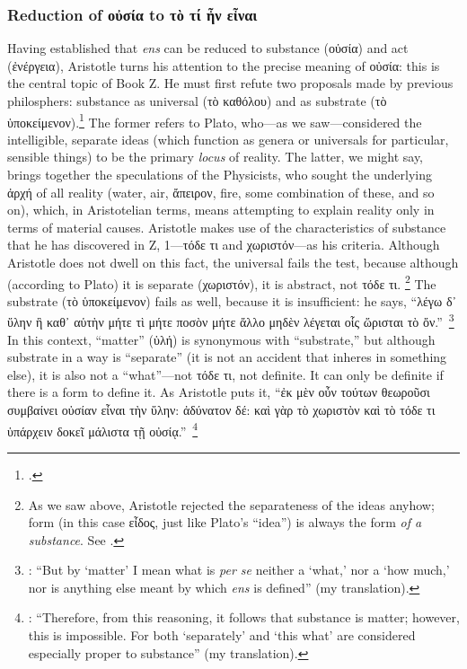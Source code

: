 \subsubsection{Reduction of οὐσία to τὸ τί ἦν εἶναι}
\label{sec:aristotle-reduction}

Having established that \emph{ens} can be reduced to substance (οὐσία) and act (ἐνέργεια), Aristotle turns his attention to the precise meaning of οὐσία: this is the central topic of Book Ζ. He must first refute two proposals made by previous philosphers: substance as universal (τὸ καθόλου) and as substrate (τὸ ὑποκείμενον).\footcite[See][Ζ,~3, 1028b33–35]{aristotle:metaphysics} The former refers to Plato, who—as we saw—considered the intelligible, separate ideas (which function as genera or universals for particular, sensible things) to be the primary \emph{locus} of reality. The latter, we might say, brings together the speculations of the Physicists, who sought the underlying ἀρχή of all reality (water, air, ἄπειρον, fire, some combination of these, and so on), which, in Aristotelian terms, means attempting to explain reality only in terms of material causes. Aristotle makes use of the characteristics of substance that he has discovered in Ζ, 1—τόδε τι and χωριστόν—as his criteria. Although Aristotle does not dwell on this fact, the universal fails the test, because although (according to Plato) it is separate (χωριστόν), it is abstract, not τόδε τι.%
%
\footnote{As we saw above, Aristotle rejected the separateness of the ideas anyhow; form (in this case εἶδος, just like Plato’s “idea”) is always the form \emph{of a substance}. See \cite[Ζ,~3, 1029a30–33]{aristotle:metaphysics}.}
%
The substrate (τὸ ὑποκείμενον) fails as well, because it is insufficient: he says, “λέγω δ᾽ ὕλην ἣ καθ᾽ αὑτὴν μήτε τὶ μήτε ποσὸν μήτε ἄλλο μηδὲν λέγεται οἷς ὥρισται τὸ ὄν.”\,%
%
\footnote{\Cite[Ζ,~3, 1029a20]{aristotle:metaphysics}: “But by ‘matter’ I mean what is \emph{per se} neither a ‘what,’ nor a ‘how much,’ nor is anything else meant by which \emph{ens} is defined” (my translation).}
%
In this context, “matter” (ὑλή) is synonymous with “substrate,” but although substrate in a way is “separate” (it is not an accident that inheres in something else), it is also not a “what”—not τόδε τι, not definite. It can only be definite if there is a form to define it. As Aristotle puts it, “ἐκ μὲν οὖν τούτων θεωροῦσι συμβαίνει οὐσίαν εἶναι τὴν ὕλην: ἀδύνατον δέ: καὶ γὰρ τὸ χωριστὸν καὶ τὸ τόδε τι ὑπάρχειν δοκεῖ μάλιστα τῇ οὐσίᾳ.”\,%
%
\footnote{\Cite[Ζ,~3, 1029a28–29]{aristotle:metaphysics}: “Therefore, from this reasoning, it follows that substance is matter; however, this is impossible. For both ‘separately’ and ‘this what’ are considered especially proper to substance” (my translation).}
%

